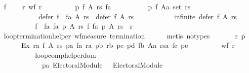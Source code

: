 \begin{isabellebody}
\ f{}{\isacharcolon}{\kern0pt}\isanewline
\ \ \ \ {\isachardoublequoteopen}{\isasymexists}r{\isachardot}{\kern0pt}\ wf\ r\ {\isasymand}\isanewline
\ \ \ \ \ \ \ \ {\isacharparenleft}{\kern0pt}{\isasymforall}p\ f\ A\ rs\ fa{\isachardot}{\kern0pt}\isanewline
\ \ \ \ \ \ \ \ \ \ p\ {\isacharparenleft}{\kern0pt}f\ {\isacharparenleft}{\kern0pt}A{\isacharcolon}{\kern0pt}{\isacharcolon}{\kern0pt}{\isacharprime}{\kern0pt}a\ set{\isacharparenright}{\kern0pt}\ rs{\isacharparenright}{\kern0pt}\ {\isasymor}\isanewline
\ \ \ \ \ \ \ \ \ \ {\isasymnot}\ defer\ {\isacharparenleft}{\kern0pt}f\ {\isasymtriangleright}\ fa{\isacharparenright}{\kern0pt}\ A\ rs\ {\isasymsubset}\ defer\ f\ A\ rs\ {\isasymor}\isanewline
\ \ \ \ \ \ \ \ \ \ infinite\ {\isacharparenleft}{\kern0pt}defer\ f\ A\ rs{\isacharparenright}{\kern0pt}\ {\isasymor}\isanewline
\ \ \ \ \ \ \ \ \ \ {\isacharparenleft}{\kern0pt}{\isacharparenleft}{\kern0pt}f\ {\isasymtriangleright}\ fa{\isacharcomma}{\kern0pt}\ fa{\isacharcomma}{\kern0pt}\ p{\isacharcomma}{\kern0pt}\ A{\isacharcomma}{\kern0pt}\ rs{\isacharparenright}{\kern0pt}{\isacharcomma}{\kern0pt}\ {\isacharparenleft}{\kern0pt}f{\isacharcomma}{\kern0pt}\ fa{\isacharcomma}{\kern0pt}\ p{\isacharcomma}{\kern0pt}\ A{\isacharcomma}{\kern0pt}\ rs{\isacharparenright}{\kern0pt}{\isacharparenright}{\kern0pt}\ {\isasymin}\ r{\isacharparenright}{\kern0pt}{\isachardoublequoteclose}\isanewline
\ \ \ \ \isamarkupfalse%
\ loop{\isacharunderscore}{\kern0pt}termination{\isacharunderscore}{\kern0pt}helper\ wf{\isacharunderscore}{\kern0pt}measure\ {\isachardoublequoteopen}termination{\isachardoublequoteclose}\isanewline
\ \ \ \ \isamarkupfalse%
\ {\isacharparenleft}{\kern0pt}metis\ {\isacharparenleft}{\kern0pt}no{\isacharunderscore}{\kern0pt}types{\isacharparenright}{\kern0pt}{\isacharparenright}{\kern0pt}\isanewline
\ \ \isamarkupfalse%
\isanewline
\ \ \ \ {\isachardoublequoteopen}{\isasymforall}r\ p{\isachardot}{\kern0pt}\isanewline
\ \ \ \ \ \ Ex\ {\isacharparenleft}{\kern0pt}{\isacharparenleft}{\kern0pt}{\isasymlambda}ra{\isachardot}{\kern0pt}\ {\isasymforall}f\ A\ rs\ pa\ fa{\isachardot}{\kern0pt}\ {\isasymexists}ra\ pb\ rb\ pc\ pd\ fb\ Aa\ rsa\ fc\ pe{\isachardot}{\kern0pt}\isanewline
\ \ \ \ \ \ \ \ {\isasymnot}\ wf\ r\ {\isasymor}\isanewline
\ \ \ \ \ \ \ \ \ \ loop{\isacharunderscore}{\kern0pt}comp{\isacharunderscore}{\kern0pt}helper{\isacharunderscore}{\kern0pt}dom\isanewline
\ \ \ \ \ \ \ \ \ \ \ \ {\isacharparenleft}{\kern0pt}p{\isacharcolon}{\kern0pt}{\isacharcolon}{\kern0pt}{\isacharparenleft}{\kern0pt}{\isacharprime}{\kern0pt}a\ Electoral{\isacharunderscore}{\kern0pt}Module{\isacharparenright}{\kern0pt}\ {\isasymtimes}\ {\isacharparenleft}{\kern0pt}{\isacharunderscore}{\kern0pt}\ Electoral{\isacharunderscore}{\kern0pt}Module{\isacharparenright}{\kern0pt}\ {\isasymtimes}\isanewline

\end{isabellebody}
